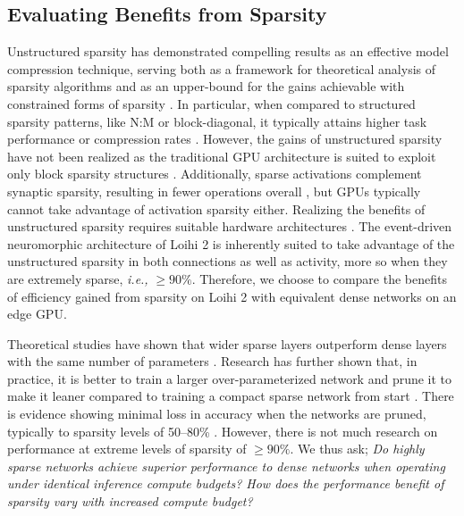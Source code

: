 
\subsection{Evaluating Benefits from Sparsity}

Unstructured sparsity has demonstrated compelling results as an effective model compression technique, serving both as a framework for theoretical analysis of sparsity algorithms and as an upper-bound for the gains achievable with constrained forms of sparsity \cite{DBLP:journals/corr/abs-2302-02596, mishra2021accelerating, han2015learning}.
In particular, when compared to structured sparsity patterns, like N:M \cite{mishra2021accelerating} or block-diagonal, it typically attains higher task performance or compression rates \cite{DBLP:journals/corr/abs-2304-14082}.
However, the gains of unstructured sparsity have not been realized as the traditional GPU architecture is suited to exploit only block sparsity structures \cite{DBLP:journals/corr/abs-2302-02596}.
Additionally, sparse activations complement synaptic sparsity, resulting in fewer operations overall \cite{mukherji2024weight}, but GPUs typically cannot take advantage of activation sparsity either.
Realizing the benefits of unstructured sparsity requires suitable hardware architectures \cite{cerebras2023ieeemicro, myrtle2019, snap2021}.
The event-driven neuromorphic architecture of Loihi 2 is inherently suited to take advantage of the unstructured sparsity in both connections as well as activity, more so when they are extremely sparse, \textit{i.e.,} $\geq 90\%$. Therefore, we choose to compare the benefits of efficiency gained from sparsity on Loihi 2 with equivalent dense networks on an edge GPU.

Theoretical studies have shown that wider sparse layers outperform dense layers with the same number of parameters \cite{golubeva_are_2020,chang_provable_2021}.
Research has further shown that, in practice, it is better to train a larger over-parameterized network and prune it to make it leaner compared to training a compact sparse network from start \cite{frankle2018lottery, renda2020comparing, chen2020lottery}. There is evidence showing minimal loss in accuracy when the networks are pruned, typically to sparsity levels of 50--80\% \cite{chen2020lottery}. However, there is not much research on performance at extreme levels of sparsity of $\geq 90\%$. %
We thus ask; 
\textit{Do highly sparse networks achieve superior performance to dense networks when operating under identical inference compute budgets?
How does the performance benefit of sparsity vary with increased compute budget?}

